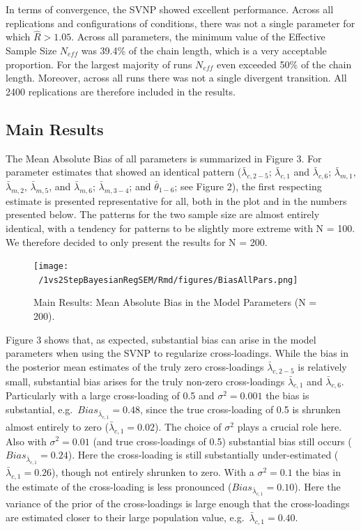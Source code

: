 \documentclass[
  man,floatsintext]{apa6}
\begin{document}
In terms of convergence, the SVNP showed excellent performance. Across all replications and configurations of conditions, there was not a single parameter for which \(\hat{R} > 1.05\). Across all parameters, the minimum value of the Effective Sample Size \(N_{eff}\) was 39.4\% of the chain length, which is a very acceptable proportion. For the largest majority of runs \(N_{eff}\) even exceeded 50\% of the chain length. Moreover, across all runs there was not a single divergent transition. All 2400 replications are therefore included in the results.

\hypertarget{main-results}{%
\subsection{Main Results}\label{main-results}}

The Mean Absolute Bias of all parameters is summarized in Figure 3. For parameter estimates that showed an identical pattern (\(\bar{\lambda}_{c, 2-5}\); \(\bar{\lambda}_{c, 1}\) and \(\bar{\lambda}_{c, 6}\); \(\bar{\lambda}_{m, 1}\), \(\bar{\lambda}_{m, 2}\), \(\bar{\lambda}_{m, 5}\), and \(\bar{\lambda}_{m, 6}\); \(\bar{\lambda}_{m, 3-4}\); and \(\bar{\theta}_{1-6}\); see Figure 2), the first respecting estimate is presented representative for all, both in the plot and in the numbers presented below. The patterns for the two sample size are almost entirely identical, with a tendency for patterns to be slightly more extreme with N = 100. We therefore decided to only present the results for N = 200.

\begin{figure}
\centering
\texttt{[image: ~/1vs2StepBayesianRegSEM/Rmd/figures/BiasAllPars.png]}
\caption{Main Results: Mean Absolute Bias in the Model Parameters (N = 200).}
\end{figure}

Figure 3 shows that, as expected, substantial bias can arise in the model parameters when using the SVNP to regularize cross-loadings. While the bias in the posterior mean estimates of the truly zero cross-loadings \(\bar{\lambda}_{c, 2-5}\) is relatively small, substantial bias arises for the truly non-zero cross-loadings \(\bar{\lambda}_{c, 1}\) and \(\bar{\lambda}_{c, 6}\). Particularly with a large cross-loading of 0.5 and \(\sigma^2 = 0.001\) the bias is substantial, e.g.~\(Bias_{\bar{\lambda}_{c, 1}} = 0.48\), since the true cross-loading of 0.5 is shrunken almost entirely to zero (\(\bar{\lambda}_{c, 1} = 0.02\)). The choice of \(\sigma^2\) plays a crucial role here. Also with \(\sigma^2 = 0.01\) (and true cross-loadings of 0.5) substantial bias still occurs (\(Bias_{\bar{\lambda}_{c, 1}} = 0.24\)). Here the cross-loading is still substantially under-estimated (\(\bar{\lambda}_{c, 1} = 0.26\)), though not entirely shrunken to zero. With a \(\sigma^2 = 0.1\) the bias in the estimate of the cross-loading is less pronounced (\(Bias_{\bar{\lambda}_{c, 1}} = 0.10\)). Here the variance of the prior of the cross-loadings is large enough that the cross-loadings are estimated closer to their large population value, e.g.~\(\bar{\lambda}_{c, 1} = 0.40\).
\end{document}
